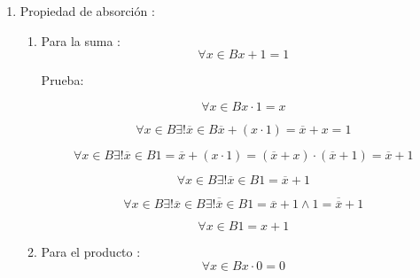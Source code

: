 \documentclass[
]{article}
\begin{document}
\begin{enumerate}
\begin{enumerate}
\begin{enumerate}
\begin{enumerate}
        \[x{: = 0}{\overline{x} = 1}{{{0 =} = {1 \cdot e}} = e}\]

        \[{\forall{u \in B}\left( {\forall{x \in B}{{x + e} = x}} \right)}\Rightarrow\left( {e = 0} \right)\]
      \item
        Solo hay un \[1\]o elemento neutro del
        producto:\[\forall{u \in B}{{({\forall{x \in B}{{x \cdot u} = x}})}\Rightarrow{({u = 1})}}\]

        Prueba:

        \[\forall{x \in B}{x \cdot u}{=}x\]

        \[\forall{x \in B}\exists{\overline{x} \in B}{{{\overline{x} + {({x \cdot u})}} = {\overline{x} + x}} = 1}\]

        \[\forall{x \in B}\exists{\overline{x} \in B}1{{{{= {\overline{x} + {({x \cdot u})}}} = {\overline{x} + x}} = {\overline{x} + u}} = {\overline{x} + u}}\]

        \[x{: = 1}{\overline{x} = 0}{{{1 =} = {0 + u}} = u}\]

        \[{\forall{u \in B}\left( {\forall{x \in B}{{x \cdot u} = x}} \right)}\Rightarrow\left( {u = 1} \right)\]
      \end{enumerate}
    \item
      Propiedad de absorción :

      \begin{enumerate}
      \def\labelenumiv{\arabic{enumiv}.}
      \item
        Para la suma : \[\forall{x \in B}{{x + 1} = 1}\]

        Prueba:

        \[\forall{x \in B}{x \cdot 1}{=}x\]

        \[\forall{x \in B}{\exists\mathtt{\mathrm{!}}}{\overline{x} \in B}{{{\overline{x} + {({x \cdot 1})}} = {\overline{x} + x}} = 1}\]

        \[\forall{x \in B}{\exists\mathtt{\mathrm{!}}}{\overline{x} \in B}{{{1 = {\overline{x} + {({x \cdot 1})}}} = {{({\overline{x} + x})} \cdot {({\overline{x} + 1})}}} = {\overline{x} + 1}}\]

        \[\forall{x \in B}{\exists\mathtt{\mathrm{!}}}{\overline{x} \in B}{1 = {\overline{x} + 1}}\]

        \[\forall{x \in B}{\exists\mathtt{\mathrm{!}}}{\overline{x} \in B}{\exists\mathtt{\mathrm{!}}}{\overline{\overline{x}} \in B}{1 = {\overline{x} + 1}} \land {1 = {\overline{\overline{x}} + 1}}\]

        \[\forall{x \in B}{1 = {x + 1}}\]
      \item
        Para el producto : \[\forall{x \in B}{{x \cdot 0} = 0}\]


\end{enumerate}
\end{enumerate}
\end{enumerate}
\end{enumerate}
\end{document}
